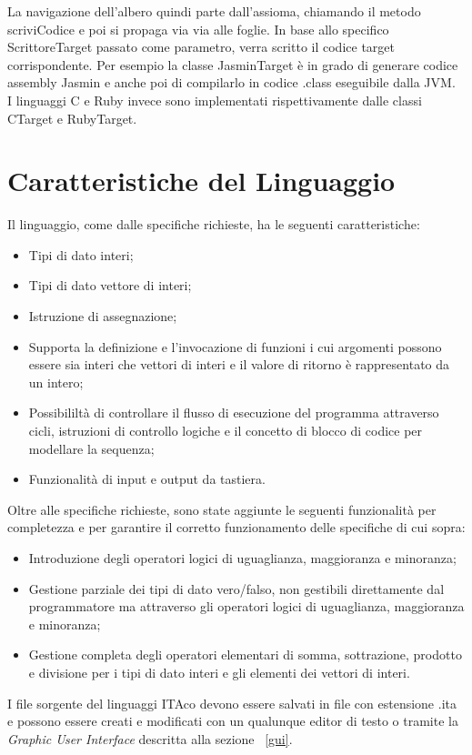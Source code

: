 \documentclass[11pt, a4paper, twoside, notitlepage]{report}
\begin{document}
La navigazione dell'albero quindi parte dall'assioma, chiamando il metodo
scriviCodice e poi si propaga via via alle foglie. In base allo specifico
ScrittoreTarget passato come parametro, verra scritto il
codice target corrispondente. Per esempio la classe JasminTarget è in grado di
generare codice assembly Jasmin e anche poi di compilarlo in codice .class
eseguibile dalla JVM. \\I linguaggi C e Ruby invece sono implementati
rispettivamente dalle classi CTarget e RubyTarget.

\chapter{Caratteristiche del Linguaggio}
Il linguaggio, come dalle specifiche richieste, ha le seguenti caratteristiche:
\begin{itemize}
  \item Tipi di dato interi;
  \item Tipi di dato vettore di interi;
  \item Istruzione di assegnazione;
  \item Supporta la definizione e l'invocazione di funzioni i cui argomenti
  possono essere sia interi che vettori di interi e il valore di ritorno è
  rappresentato da un intero;
  \item Possibililtà di controllare il flusso di esecuzione del programma
  attraverso cicli, istruzioni di controllo logiche e il concetto di blocco di
  codice per modellare la sequenza;
  \item Funzionalità di input e output da tastiera.
\end{itemize}

Oltre alle specifiche richieste, sono state aggiunte le seguenti funzionalità
per completezza e per garantire il corretto funzionamento delle specifiche di
cui sopra:
\begin{itemize}
  \item Introduzione degli operatori logici di uguaglianza, maggioranza e
  minoranza;
  \item Gestione parziale dei tipi di dato vero/falso, non gestibili
  direttamente dal programmatore ma attraverso gli operatori logici di
  uguaglianza, maggioranza e minoranza;
  \item Gestione completa degli operatori elementari di somma, sottrazione,
  prodotto e divisione per i tipi di dato interi e gli elementi dei vettori di
  interi.
\end{itemize}
I file sorgente del linguaggi ITAco devono essere salvati in file con estensione
.ita e possono essere creati e modificati con un qualunque editor di testo o
tramite la \emph{Graphic User Interface} descritta alla sezione ~\ref{gui}.
\end{document}
